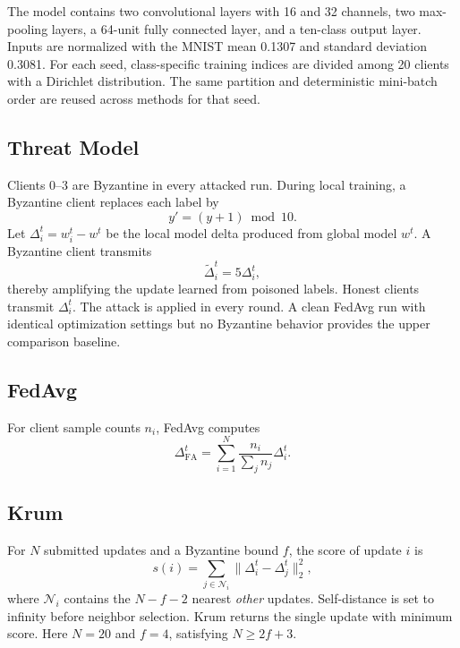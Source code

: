 \documentclass[10pt,letterpaper]{article}
\begin{document}
The model contains two convolutional layers with 16 and 32 channels, two
max-pooling layers, a 64-unit fully connected layer, and a ten-class output
layer. Inputs are normalized with the MNIST mean 0.1307 and standard deviation
0.3081. For each seed, class-specific training indices are divided among 20
clients with a Dirichlet distribution. The same partition and deterministic
mini-batch order are reused across methods for that seed.

\subsection{Threat Model}

Clients 0--3 are Byzantine in every attacked run. During local training, a
Byzantine client replaces each label by
\begin{equation}
y'=(y+1)\bmod 10.
\end{equation}
Let $\Delta_i^t=w_i^t-w^t$ be the local model delta produced from global model
$w^t$. A Byzantine client transmits
\begin{equation}
\widetilde{\Delta}_i^t=5\Delta_i^t,
\end{equation}
thereby amplifying the update learned from poisoned labels. Honest clients
transmit $\Delta_i^t$. The attack is applied in every round. A clean FedAvg run
with identical optimization settings but no Byzantine behavior provides the
upper comparison baseline.

\subsection{FedAvg}

For client sample counts $n_i$, FedAvg computes
\begin{equation}
\Delta_{\mathrm{FA}}^t =
\sum_{i=1}^{N}\frac{n_i}{\sum_j n_j}\Delta_i^t.
\end{equation}

\subsection{Krum}

For $N$ submitted updates and a Byzantine bound $f$, the score of update $i$ is
\begin{equation}
s(i)=\sum_{j\in\mathcal{N}_i}\|\Delta_i^t-\Delta_j^t\|_2^2,
\end{equation}
where $\mathcal{N}_i$ contains the $N-f-2$ nearest \emph{other} updates.
Self-distance is set to infinity before neighbor selection. Krum returns the
single update with minimum score. Here $N=20$ and $f=4$, satisfying
$N\geq2f+3$.
\end{document}
